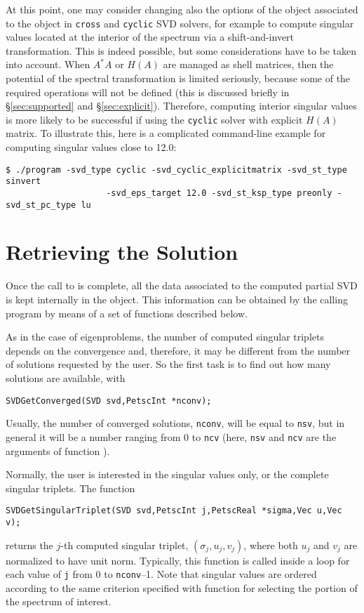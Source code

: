 At this point, one may consider changing also the options of the  object associated to the  object in \texttt{cross} and \texttt{cyclic} SVD solvers, for example to compute singular values located at the interior of the spectrum via a shift-and-invert transformation. This is indeed possible, but some considerations have to be taken into account. When $A^*A$ or $H(A)$ are managed as shell matrices, then the potential of the spectral transformation is limited seriously, because some of the required operations will not be defined (this is discussed briefly in \S\ref{sec:supported} and \S\ref{sec:explicit}). Therefore, computing interior singular values is more likely to be successful if using the \texttt{cyclic} solver with explicit $H(A)$ matrix. To illustrate this, here is a complicated command-line example for computing singular values close to 12.0:
\begin{Verbatim}[fontsize=\small]
	$ ./program -svd_type cyclic -svd_cyclic_explicitmatrix -svd_st_type sinvert
                    -svd_eps_target 12.0 -svd_st_ksp_type preonly -svd_st_pc_type lu
\end{Verbatim}

\section{Retrieving the Solution}

Once the call to  is complete, all the data associated to the computed partial SVD is kept internally in the  object. This information can be obtained by the calling program by means of a set of functions described below.

As in the case of eigenproblems, the number of computed singular triplets depends on the convergence and, therefore, it may be different from the number of solutions requested by the user. So the first task is to find out how many solutions are available, with
	\begin{Verbatim}[fontsize=\small]
	SVDGetConverged(SVD svd,PetscInt *nconv);
	\end{Verbatim}
Usually, the number of converged solutions, \texttt{nconv}, will be equal to \texttt{nsv}, but in general it will be a number ranging from 0 to \texttt{ncv} (here, \texttt{nsv} and \texttt{ncv} are the arguments of function ).

Normally, the user is interested in the singular values only, or the complete singular triplets. The function
	\begin{Verbatim}[fontsize=\small]
	SVDGetSingularTriplet(SVD svd,PetscInt j,PetscReal *sigma,Vec u,Vec v);
	\end{Verbatim}
returns the $j$-th computed singular triplet, $(\sigma_j,u_j,v_j)$, where both $u_j$ and $v_j$ are normalized to have unit norm. Typically, this function is called inside a loop for each value of \texttt{j} from 0 to \texttt{nconv}--1. Note that singular values are ordered according to the same criterion specified with function  for selecting the portion of the spectrum of interest.

